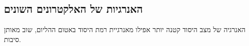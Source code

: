 \subsection{האנרגיות של האלקטרונים השונים}
\begin{table}[h!]
    \centering
        \centering
        
        \caption{האנרגיה של כל אחד מהאלקטרונים באטום.}
        \label{tab:O_energies}
\end{table}
האנרגיה של מצב היסוד קטנה יותר אפילו מאנרגיית רמת היסוד באטום ההליום, שוב מאותן סיבות.